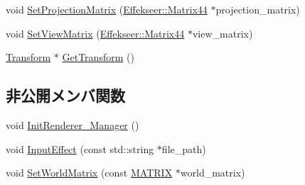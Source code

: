 \begin{DoxyCompactItemize}
\item 
void \mbox{\hyperlink{class_effekseer_object_aa3849f176ccb493b162d08c1ef387996}{Set\+Projection\+Matrix}} (\mbox{\hyperlink{struct_effekseer_1_1_matrix44}{Effekseer\+::\+Matrix44}} $\ast$projection\+\_\+matrix)
\item 
void \mbox{\hyperlink{class_effekseer_object_ac7f3145b79b5e65e45014abd30ee5de8}{Set\+View\+Matrix}} (\mbox{\hyperlink{struct_effekseer_1_1_matrix44}{Effekseer\+::\+Matrix44}} $\ast$view\+\_\+matrix)
\item 
\mbox{\hyperlink{class_transform}{Transform}} $\ast$ \mbox{\hyperlink{class_effekseer_object_ad7e825d08856df48459437ad759d7a00}{Get\+Transform}} ()
\end{DoxyCompactItemize}
\subsection*{非公開メンバ関数}
\begin{DoxyCompactItemize}
\item 
void \mbox{\hyperlink{class_effekseer_object_a4f8e7ad6b6ebfa341302f6b78e846f1e}{Init\+Renderer\+\_\+\+Manager}} ()
\item 
void \mbox{\hyperlink{class_effekseer_object_a1566339dd4acebff341a867a2fd05c17}{Input\+Effect}} (const std\+::string $\ast$file\+\_\+path)
\item 
void \mbox{\hyperlink{class_effekseer_object_afde70f366e91d31a84ff9b280d4ae3c4}{Set\+World\+Matrix}} (const \mbox{\hyperlink{_vector3_d_8h_a032295cd9fb1b711757c90667278e744}{M\+A\+T\+R\+IX}} $\ast$world\+\_\+matrix)
\end{DoxyCompactItemize}
